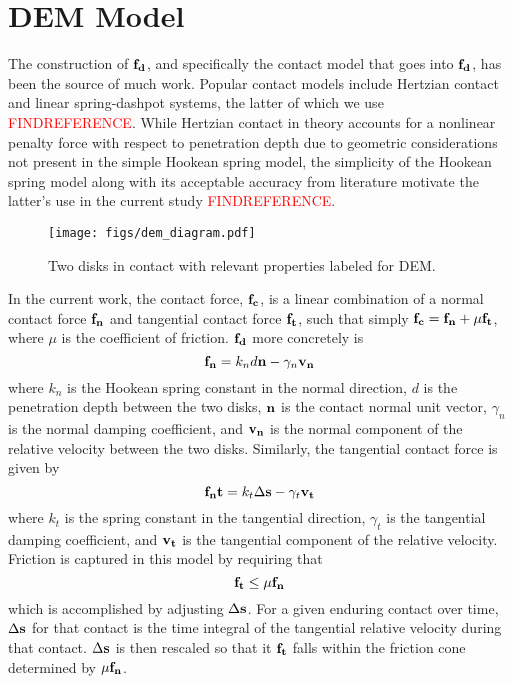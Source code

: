 \section{DEM Model} \label{DEM_Model}
The construction of $\bold{f_d}$, and specifically the contact model that goes into $\bold{f_d}$, has been the source of much work. Popular contact models include Hertzian contact and linear spring-dashpot systems, the latter of which we use \textcolor{red}{FINDREFERENCE}. While Hertzian contact in theory accounts for a nonlinear penalty force with respect to penetration depth due to geometric considerations not present in the simple Hookean spring model, the simplicity of the Hookean spring model along with its acceptable accuracy from literature motivate the latter's use in the current study \textcolor{red}{FINDREFERENCE}. 

\begin{figure}[htp] 
    \centering
    \texttt{[image: figs/dem\_diagram.pdf]}
    \caption{Two disks in contact with relevant properties labeled for DEM.}
    \label{DEM_diagram}
\end{figure}

In the current work, the contact force, $\bold{f_c}$, is a linear combination of a normal contact force $\bold{f_n}$ and tangential contact force $\bold{f_t}$, such that simply $\bold{f_c} = \bold{f_n} + \mu\bold{f_t}$, where $\mu$ is the coefficient of friction. $\bold{f_d}$ more concretely is
$$\bold{f_n}=k_nd\bold{n}-\gamma_n\bold{v_n}$$
where $k_n$ is the Hookean spring constant in the normal direction, $d$ is the penetration depth between the two disks, $\bold{n}$ is the contact normal unit vector, $\gamma_n$ is the normal damping coefficient, and $\bold{v_n}$ is the normal component of the relative velocity between the two disks. Similarly, the tangential contact force is given by
$$\bold{f_nt}=k_t\Delta\bold{s}-\gamma_t\bold{v_t}$$
where $k_t$ is the spring constant in the tangential direction, $\gamma_t$ is the tangential damping coefficient, and $\bold{v_t}$ is the tangential component of the relative velocity. Friction is captured in this model by requiring that
$$\bold{f_t}\leq\mu\bold{f_n}$$
which is accomplished by adjusting $\Delta\bold{s}$. For a given enduring contact over time, $\Delta\bold{s}$ for that contact is the time integral of the tangential relative velocity during that contact. $\Delta\bold{s}$ is then rescaled so that it $\bold{f_t}$ falls within the friction cone determined by $\mu\bold{f_n}$.

